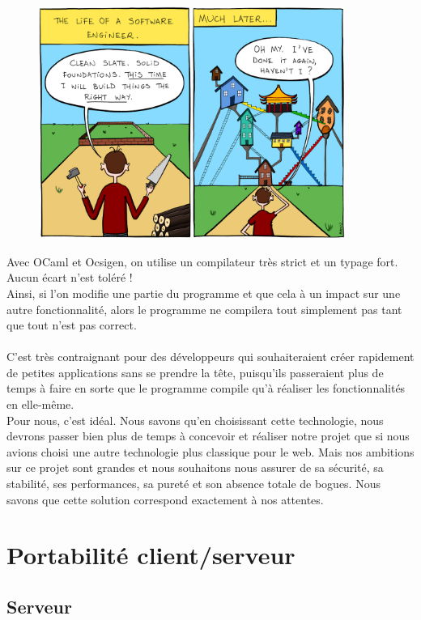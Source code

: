 \documentclass{life-fr}
\begin{document}
\begin{figure}[H]
  \begin{center}
    \includegraphics[width=10cm]{img/proj.png}
  \end{center}
\end{figure}

Avec OCaml et Ocsigen, on utilise un compilateur très strict et un typage fort. Aucun écart n'est toléré !\\
Ainsi, si l'on modifie une partie du programme et que cela à un impact sur une autre fonctionnalité, alors le programme ne compilera tout simplement pas tant que tout n'est pas correct.\\
\\
C'est très contraignant pour des développeurs qui souhaiteraient créer rapidement de petites applications sans se prendre la tête, puisqu'ils passeraient plus de temps à faire en sorte que le programme compile qu'à réaliser les fonctionnalités en elle-même.\\
Pour nous, c'est idéal. Nous savons qu'en choisissant cette technologie, nous devrons passer bien plus de temps à concevoir et réaliser notre projet que si nous avions choisi une autre technologie plus classique pour le web. Mais nos ambitions sur ce projet sont grandes et nous souhaitons nous assurer de sa sécurité, sa stabilité, ses performances, sa pureté et son absence totale de bogues. Nous savons que cette solution correspond exactement à nos attentes.
\\

\section{Portabilité client/serveur}

\subsection{Serveur}
\end{document}
